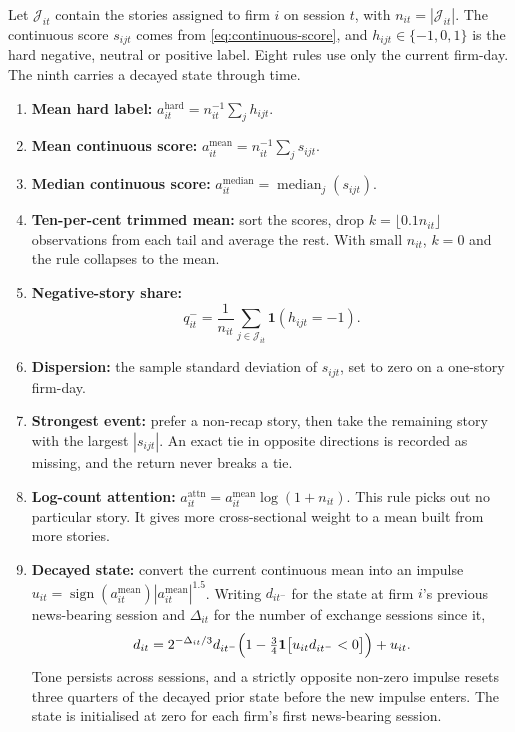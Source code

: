 Let $\mathcal{J}_{it}$ contain the stories assigned to firm $i$ on session $t$,
with $n_{it}=|\mathcal{J}_{it}|$. The continuous score $s_{ijt}$ comes from
\cref{eq:continuous-score}, and $h_{ijt}\in\{-1,0,1\}$ is the hard negative,
neutral or positive label. Eight rules use only the current firm-day. The ninth
carries a decayed state through time.

\begin{enumerate}[leftmargin=0.9cm]
  \item \textbf{Mean hard label:}
  $a^{\mathrm{hard}}_{it}=n_{it}^{-1}\sum_j h_{ijt}$.

  \item \textbf{Mean continuous score:}
  $a^{\mathrm{mean}}_{it}=n_{it}^{-1}\sum_j s_{ijt}$.

  \item \textbf{Median continuous score:}
  $a^{\mathrm{median}}_{it}=\operatorname{median}_{j}(s_{ijt})$.

  \item \textbf{Ten-per-cent trimmed mean:} sort the scores, drop
  $k=\lfloor0.1n_{it}\rfloor$ observations from each tail and average the rest.
  With small $n_{it}$, $k=0$ and the rule collapses to the mean.

  \item \textbf{Negative-story share:}
  \begin{equation}
  q^{-}_{it}=\frac{1}{n_{it}}\sum_{j\in\mathcal{J}_{it}}
  \mathbf{1}(h_{ijt}=-1).
  \label{eq:negative-share}
  \end{equation}

  \item \textbf{Dispersion:} the sample standard deviation of $s_{ijt}$, set to
  zero on a one-story firm-day.

  \item \textbf{Strongest event:} prefer a non-recap story, then take the
  remaining story with the largest $|s_{ijt}|$. An exact tie in opposite
  directions is recorded as missing, and the return never breaks a tie.

  \item \textbf{Log-count attention:}
  $a^{\mathrm{attn}}_{it}=a^{\mathrm{mean}}_{it}\log(1+n_{it})$. This rule picks
  out no particular story. It gives more cross-sectional weight to a mean built
  from more stories.

  \item \textbf{Decayed state:} convert the current continuous mean into an
  impulse $u_{it}=\operatorname{sign}(a^{\mathrm{mean}}_{it})|a^{\mathrm{mean}}_{it}|^{1.5}$.
  Writing $d_{it^{-}}$ for the state at firm $i$'s previous news-bearing session
  and $\Delta_{it}$ for the number of exchange sessions since it,
  \begin{equation}
   d_{it}=2^{-\Delta_{it}/3}d_{it^{-}}
   \Bigl(1-\tfrac{3}{4}\mathbf{1}\bigl[u_{it}d_{it^{-}}<0\bigr]\Bigr)+u_{it}.
   \label{eq:decayed-state}
  \end{equation}
  Tone persists across sessions, and a strictly opposite non-zero impulse
  resets three quarters of the decayed prior state before the new impulse enters.
  The state is initialised at zero for each firm's first news-bearing session.
\end{enumerate}

